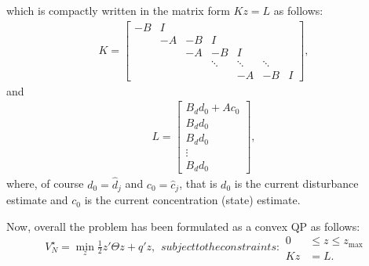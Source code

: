 \documentclass[12pt]{scrartcl}
\begin{document}
which is compactly written in the matrix form $Kz = L$ as follows:
\begin{align}
K=\left[\begin{array}{ccccccc}
-B & I\\
& -A & -B &I\\
&& -A & -B &I\\
&&&\ddots & \ddots & \ddots\\
&&&&-A&-B&I
\end{array}\right],
\end{align}
and
\begin{align}
L=\left[
\begin{array}{c}
B_d d_0 + Ac_0\\
B_d d_0\\
B_d d_0\\
\vdots\\
B_d d_0
\end{array}\right],
\end{align}
where, of course $d_0=\hat{d}_j$ and $c_0=\hat{c}_j$, that is
$d_0$ is the current disturbance estimate and $c_0$ is the current
concentration (state) estimate.

Now, overall the problem has been formulated as a convex QP as follows:
\begin{subequations}
\begin{align}
V_N^\star = \min_{z} \frac{1}{2}z'\Theta z + q'z,
\end{align}
subject to the constraints:
\begin{align}
0 &\leq z \leq z_{\max}\label{eq:z-bound}\\
Kz &= L.
\end{align}
\end{subequations}
\end{document}
